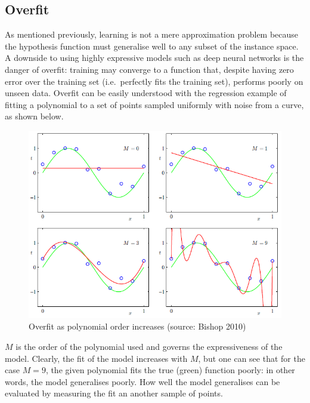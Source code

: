\documentclass[a4paper,11pt]{article}
\begin{document}

\subsection{Overfit}

As mentioned previously, learning is not a mere approximation problem because the hypothesis function must generalise well to any subset of the instance space. A downside to using highly expressive models such as deep neural networks is the danger of overfit: training may converge to a function that, despite having zero error over the training set (i.e.\ perfectly fits the training set), performs poorly on unseen data. Overfit can be easily understood with the regression example of fitting a polynomial to a set of points sampled uniformly with noise from a curve, as shown below. 

\begin{figure}[h!]
	\centering
	\includegraphics[scale=0.8]{images/overfit.png}
	\caption{Overfit as polynomial order increases (source: Bishop 2010)}
\end{figure}

$M$ is the order of the polynomial used and governs the expressiveness of the model. Clearly, the fit of the model increases with $M$, but one can see that for the case $M = 9$, the given polynomial fits the true (green) function poorly: in other words, the model generalises poorly. How well the model generalises can be evaluated by measuring the fit an another sample of points. \\
\end{document}
